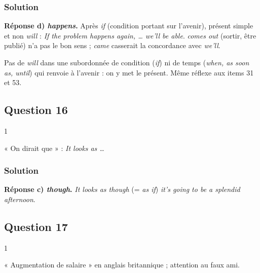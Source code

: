 \documentclass[11pt,a4paper]{article}
\begin{document}
\hypertarget{solution-14}{%
\subsubsection{Solution}\label{solution-14}}

\textbf{Réponse d) \emph{happens}.} Après \emph{if} (condition portant sur l'avenir), présent simple et non \emph{will} : \emph{If the problem happens again, \ldots{} we'll be able}. \emph{comes out} (sortir, être publié) n'a pas le bon sens ; \emph{came} casserait la concordance avec \emph{we'll}.

\begin{methode}

Pas de \emph{will} dans une subordonnée de condition (\emph{if}) ni de temps (\emph{when, as soon as, until}) qui renvoie à l'avenir : on y met le présent. Même réflexe aux items 31 et 53.

\end{methode}

\hypertarget{question-16}{%
\subsection{Question 16}\label{question-16}}

\begin{indication}{1}

« On dirait que » : \emph{It looks as \ldots{}}

\end{indication}

\hypertarget{solution-15}{%
\subsubsection{Solution}\label{solution-15}}

\textbf{Réponse c) \emph{though}.} \emph{It looks as though} (= \emph{as if}) \emph{it's going to be a splendid afternoon}.

\hypertarget{question-17}{%
\subsection{Question 17}\label{question-17}}

\begin{indication}{1}

« Augmentation de salaire » en anglais britannique ; attention au faux ami.

\end{indication}
\end{document}
